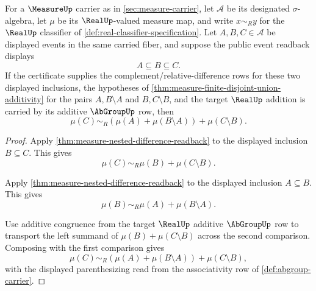 \begin{theorem}
\label{thm:measure-two-stage-nested-union-readback}
For a $\MeasureUp$ carrier as in \autoref{sec:measure-carrier}, let
$\mathcal{A}$ be its designated $\sigma$-algebra, let $\mu$ be its
$\RealUp$-valued measure map, and write $x\sim_R y$ for the $\RealUp$
classifier of \autoref{def:real-classifier-specification}. Let
$A,B,C\in\mathcal{A}$ be displayed events in the same carried fiber, and
suppose the public event readback displays
$$
A\subseteq B\subseteq C.
$$
If the certificate supplies the complement/relative-difference rows for these
two displayed inclusions, the hypotheses of
\autoref{thm:measure-finite-disjoint-union-additivity} for the pairs
$A,B\setminus A$ and $B,C\setminus B$, and the target $\RealUp$ addition is
carried by its additive $\AbGroupUp$ row, then
$$
\mu(C)\sim_R(\mu(A)+\mu(B\setminus A))+\mu(C\setminus B).
$$
\end{theorem}
\begin{proof}
Apply \autoref{thm:measure-nested-difference-readback} to the displayed
inclusion $B\subseteq C$. This gives
$$
\mu(C)\sim_R\mu(B)+\mu(C\setminus B).
$$

Apply \autoref{thm:measure-nested-difference-readback} to the displayed
inclusion $A\subseteq B$. This gives
$$
\mu(B)\sim_R\mu(A)+\mu(B\setminus A).
$$

Use additive congruence from the target $\RealUp$ additive $\AbGroupUp$ row to
transport the left summand of $\mu(B)+\mu(C\setminus B)$ across the second
comparison. Composing with the first comparison gives
$$
\mu(C)\sim_R(\mu(A)+\mu(B\setminus A))+\mu(C\setminus B),
$$
with the displayed parenthesizing read from the associativity row of
\autoref{def:abgroup-carrier}.
\end{proof}

